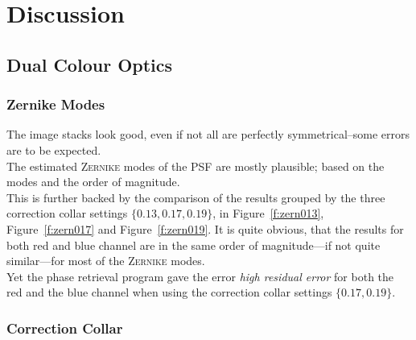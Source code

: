 \documentclass[11pt, a4paper, oneside, twocolumn]{report}
\newcommand{\e}{\emph}
\begin{document}
\twocolumn


\clearpage\chapter{Discussion}


\section{Dual Colour Optics}


\subsection{Zernike Modes}

The image stacks look good, even if not all are perfectly
symmetrical--some errors are to be expected.\\

The estimated \textsc{Zernike} modes of the PSF are mostly plausible;
based on the modes and the order of magnitude.\\

This is further backed by the comparison of the results grouped by the
three correction collar settings $\{0.13,0.17,0.19\}$, in
Figure~\ref{f:zern013}, Figure~\ref{f:zern017} and
Figure~\ref{f:zern019}. It is quite obvious, that the results for both
red and blue channel are in the same order of magnitude---if not quite
similar---for most of the \textsc{Zernike} modes.\\

Yet the phase retrieval program gave the error \e{high residual error}
for both the red and the blue channel when using the correction collar
settings $\{0.17,0.19\}$.


\subsection{Correction Collar}
\end{document}

